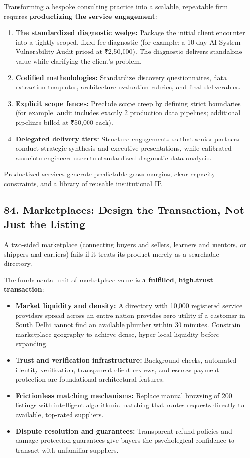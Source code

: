 Transforming a bespoke consulting practice into a scalable, repeatable firm requires \textbf{productizing the service engagement}:
\begin{enumerate}
    \item \textbf{The standardized diagnostic wedge:} Package the initial client encounter into a tightly scoped, fixed-fee diagnostic (for example: a 10-day AI System Vulnerability Audit priced at ₹2,50,000). The diagnostic delivers standalone value while clarifying the client's problem.
    \item \textbf{Codified methodologies:} Standardize discovery questionnaires, data extraction templates, architecture evaluation rubrics, and final deliverables.
    \item \textbf{Explicit scope fences:} Preclude scope creep by defining strict boundaries (for example: audit includes exactly 2 production data pipelines; additional pipelines billed at ₹50,000 each).
    \item \textbf{Delegated delivery tiers:} Structure engagements so that senior partners conduct strategic synthesis and executive presentations, while calibrated associate engineers execute standardized diagnostic data analysis.
\end{enumerate}

Productized services generate predictable gross margins, clear capacity constraints, and a library of reusable institutional IP.

\subsection*{84. Marketplaces: Design the Transaction, Not Just the Listing}

A two-sided marketplace (connecting buyers and sellers, learners and mentors, or shippers and carriers) fails if it treats its product merely as a searchable directory.

The fundamental unit of marketplace value is \textbf{a fulfilled, high-trust transaction}:
\begin{itemize}
    \item \textbf{Market liquidity and density:} A directory with 10,000 registered service providers spread across an entire nation provides zero utility if a customer in South Delhi cannot find an available plumber within 30 minutes. Constrain marketplace geography to achieve dense, hyper-local liquidity before expanding.
    \item \textbf{Trust and verification infrastructure:} Background checks, automated identity verification, transparent client reviews, and escrow payment protection are foundational architectural features.
    \item \textbf{Frictionless matching mechanisms:} Replace manual browsing of 200 listings with intelligent algorithmic matching that routes requests directly to available, top-rated suppliers.
    \item \textbf{Dispute resolution and guarantees:} Transparent refund policies and damage protection guarantees give buyers the psychological confidence to transact with unfamiliar suppliers.
\end{itemize}

